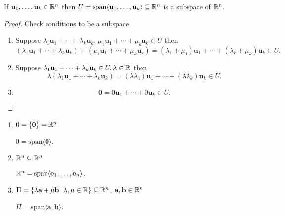 \documentclass[10pt, a4paper]{article}
\newcommand{\mbf}[1]{\mathbf{#1}}
\begin{document}
\begin{lemma}
    If $\mbf{u}_1, \dotsc, \mbf{u}_k \in \R ^ n$ then $U = \mathrm{span}\langle\mbf{u}_1, \dotsc, \mbf{u}_k\rangle \subseteq \R ^ n$ is a subspace of $\mathbb{R} ^ n$.
    \begin{proof}
        Check conditions to be a subspace
        \begin{enumerate}[label = (\roman*)]
            \item Suppose $\lambda_1\mbf{u}_1 + \dotsi + \lambda_k\mbf{u}_k$, $\mu_1\mbf{u}_1 + \dotsi + \mu_k\mbf{u}_k \in U$ then
            \[
            (\lambda_1\mbf{u}_1 + \dotsi + \lambda_k\mbf{u}_k) + (\mu_1\mbf{u}_1 + \dotsi + \mu_k\mbf{u}_k) = (\lambda_1 + \mu_1)\mbf{u}_1 + \dotsi + (\lambda_k + \mu_k)\mbf{u}_k \in U.
            \]
            \item Suppose $\lambda_1\mbf{u}_1 + \dotsi + \lambda_k\mbf{u}_k \in U, \lambda \in \R$ then
            \[
            \lambda(\lambda_1\mbf{u}_1 + \dotsi + \lambda_k\mbf{u}_k) = (\lambda\lambda_1)\mbf{u}_1 + \dotsi + (\lambda\lambda_k)\mbf{u}_k \in U.
            \]
            \item
            \[
            \mbf{0} = 0\mbf{u}_1 + \dotsi + 0\mbf{u}_k \in U.
            \]
        \end{enumerate}
    \end{proof}
\end{lemma}

\begin{example}\phantom{}
    \begin{enumerate}[label = (\roman*)]
        \item $0 = \{\mbf{0}\} = \R ^ n$
        
        $0 = \mathrm{span}\langle\mbf{0}\rangle$.
        \item $\mathbb{R} ^ n \subseteq \mathbb{R} ^ n$
        
        $\R ^ n = \mathrm{span}\langle\mbf{e}_1, \dotsc, \mbf{e}_n\rangle$.
        \item $\Pi = \{\lambda\mbf{a} + \mu\mbf{b}\,|\,\lambda, \mu \in \R\} \subseteq \R ^ n$, $\mbf{a, b} \in \R ^ n$

        $\Pi = \mathrm{span}\langle\mbf{a, b}\rangle$.
    \end{enumerate}
\end{example}
\end{document}
